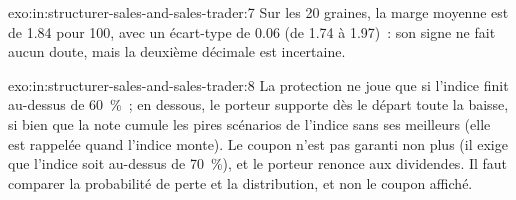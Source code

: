 \begin{solution}{exo:in:structurer-sales-and-sales-trader:7}
Sur les 20 graines, la marge moyenne est de 1.84 pour 100, avec un écart-type de 0.06 (de 1.74 à 1.97)~: son signe
ne fait aucun doute, mais la deuxième décimale est incertaine.
\end{solution}

\begin{solution}{exo:in:structurer-sales-and-sales-trader:8}
La protection ne joue que si l'indice finit au-dessus de 60~\%~; en dessous, le porteur supporte dès le départ toute la baisse, si bien
que la note cumule les pires scénarios de l'indice sans ses meilleurs (elle est rappelée quand l'indice monte). Le coupon n'est
pas garanti non plus (il exige que l'indice soit au-dessus de 70~\%), et le porteur renonce aux dividendes. Il faut comparer la probabilité de perte et
la distribution, et non le coupon affiché.
\end{solution}


